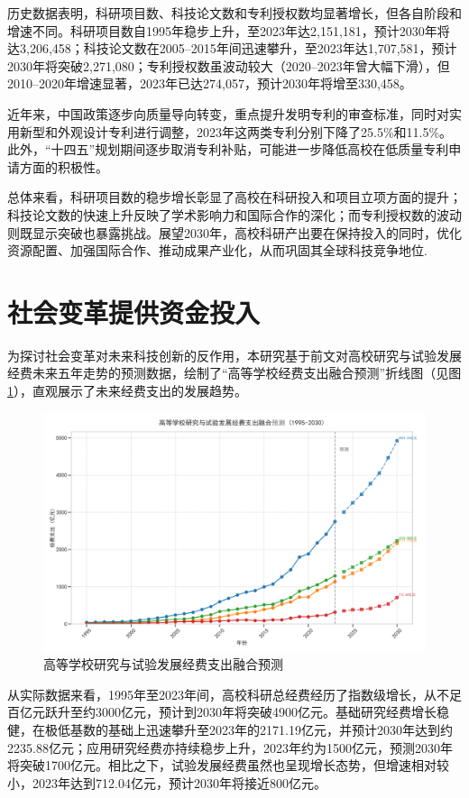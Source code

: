 历史数据表明，科研项目数、科技论文数和专利授权数均显著增长，但各自阶段和增速不同。科研项目数自1995年稳步上升，至2023年达2,151,181，预计2030年将达3,206,458；科技论文数在2005–2015年间迅速攀升，至2023年达1,707,581，预计2030年将突破2,271,080；专利授权数虽波动较大（2020–2023年曾大幅下滑），但2010–2020年增速显著，2023年已达274,057，预计2030年将增至330,458。

近年来，中国政策逐步向质量导向转变，重点提升发明专利的审查标准，同时对实用新型和外观设计专利进行调整，2023年这两类专利分别下降了25.5\%和11.5\%。此外，“十四五”规划期间逐步取消专利补贴，可能进一步降低高校在低质量专利申请方面的积极性。

总体来看，科研项目数的稳步增长彰显了高校在科研投入和项目立项方面的提升；科技论文数的快速上升反映了学术影响力和国际合作的深化；而专利授权数的波动则既显示突破也暴露挑战。展望2030年，高校科研产出要在保持投入的同时，优化资源配置、加强国际合作、推动成果产业化，从而巩固其全球科技竞争地位.

\section{社会变革提供资金投入}
为探讨社会变革对未来科技创新的反作用，本研究基于前文对高校研究与试验发展经费未来五年走势的预测数据，绘制了“高等学校经费支出融合预测”折线图（见图\ref{fig:05高等学校研究与试验发展经费支出融合预测}），直观展示了未来经费支出的发展趋势。

\begin{figure}[H]
    \centering
    \includegraphics[width=0.7\linewidth]{figure/05高等学校研究与试验发展经费支出融合预测.png}
    \caption{高等学校研究与试验发展经费支出融合预测}
    \label{fig:05高等学校研究与试验发展经费支出融合预测}
\end{figure}

从实际数据来看，1995年至2023年间，高校科研总经费经历了指数级增长，从不足百亿元跃升至约3000亿元，预计到2030年将突破4900亿元。基础研究经费增长稳健，在极低基数的基础上迅速攀升至2023年的2171.19亿元，并预计2030年达到约2235.88亿元；应用研究经费亦持续稳步上升，2023年约为1500亿元，预测2030年将突破1700亿元。相比之下，试验发展经费虽然也呈现增长态势，但增速相对较小，2023年达到712.04亿元，预计2030年将接近800亿元。

